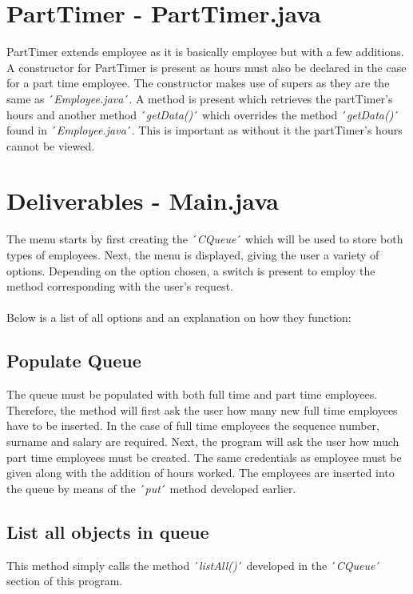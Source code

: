 \documentclass[12pt]{article}
\begin{document}
\section{PartTimer - PartTimer.java}
PartTimer extends employee as it is basically employee but with a few additions. A constructor for PartTimer is present as hours must also be declared in the case for a part time employee. The constructor makes use of supers as they are the same as ´\emph{Employee.java}´. A method is present which retrieves the partTimer's hours and another method ´\emph{getData()}´ which overrides the method ´\emph{getData()}´ found in ´\emph{Employee.java}´. This is important as without it the partTimer's hours cannot be viewed.
\bigskip

\newpage
\section{Deliverables - Main.java}
The menu starts by first creating the ´\emph{CQueue}´ which will be used to store both types of employees. Next, the menu is displayed, giving the user a variety of options. Depending on the option chosen, a switch is present to employ the method corresponding with the user's request.\\
\\Below is a list of all options and an explanation on how they function:

\subsection{Populate Queue}
The queue must be populated with both full time and part time employees. Therefore, the method will first ask the user how many new full time employees have to be inserted. In the case of full time employees the sequence number, surname and salary are required. Next, the program will ask the user how much part time employees must be created. The same credentials as employee must be given along with the addition of hours worked. The employees are inserted into the queue by means of the ´\emph{put}´ method developed earlier.

\subsection{List all objects in queue}
This method simply calls the method ´\emph{listAll()}´ developed in the ´\emph{CQueue}´ section of this program.
\end{document}
